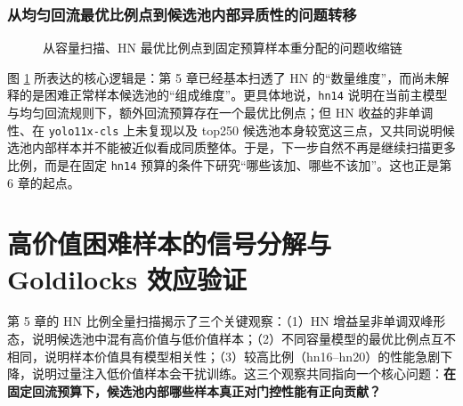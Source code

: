 \documentclass[UTF8,openany,12pt]{ctexbook}
\begin{document}
\subsection*{从均匀回流最优比例点到候选池内部异质性的问题转移}
\begin{figure}[H]
    \centering
    \caption{从容量扫描、HN 最优比例点到固定预算样本重分配的问题收缩链}
    \label{fig:hn-to-reweighting-shift}
\end{figure}

\noindent 图 \ref{fig:hn-to-reweighting-shift} 所表达的核心逻辑是：第 5 章已经基本扫透了 HN 的“数量维度”，而尚未解释的是困难正常样本候选池的“组成维度”。更具体地说，\texttt{hn14} 说明在当前主模型与均匀回流规则下，额外回流预算存在一个最优比例点；但 HN 收益的非单调性、在 \texttt{yolo11x-cls} 上未复现以及 top250 候选池本身较宽这三点，又共同说明候选池内部样本并不能被近似看成同质整体。于是，下一步自然不再是继续扫描更多比例，而是在固定 \texttt{hn14} 预算的条件下研究“哪些该加、哪些不该加”。这也正是第 6 章的起点。

\chapter{高价值困难样本的信号分解与 Goldilocks 效应验证}

\noindent 第 5 章的 HN 比例全量扫描揭示了三个关键观察：（1）HN 增益呈非单调双峰形态，说明候选池中混有高价值与低价值样本；（2）不同容量模型的最优比例点互不相同，说明样本价值具有模型相关性；（3）较高比例（hn16--hn20）的性能急剧下降，说明过量注入低价值样本会干扰训练。这三个观察共同指向一个核心问题：\textbf{在固定回流预算下，候选池内部哪些样本真正对门控性能有正向贡献？}
\end{document}
